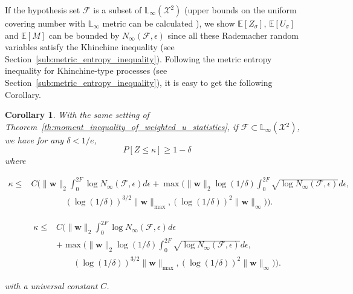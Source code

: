 \documentclass[letterpaper]{article} %
\def\DoubleColumn{}
\def\DoubleColumnEnd{}
\def\SingleColumn{}
\def\SingleColumnEnd{}
\newtheorem{corollary}{Corollary}
\newcommand{\E}{\mathbb{E}}
\newcommand{\Pro}{P}
\newcommand{\weight}{\mathbf{w}}
\newcommand{\xspace}{\mathcal{X}}
\newcommand{\rademacher}{\sigma}
\newcommand{\lebesgue}{\mathbb{L}}
\newcommand{\citep}[3]{(#1\ \citeauthor{#3}\ \citeyear{#3},\ #2)}
\begin{document}
If the hypothesis set $\mathcal{F}$ is a subset of $\lebesgue{}_\infty(\xspace^2)$ (upper bounds on the uniform covering number with $\lebesgue{}_\infty$ metric can be calculated \cite{cucker2007learning}), we show $\E[Z_\rademacher{}]$, $\E[U_\rademacher{}]$ and $\E[M]$ can be bounded by $N_\infty(\mathcal{F},\epsilon)$ since all these Rademacher random variables satisfy the Khinchine inequality (see Section~\ref{sub:metric_entropy_inequality}). Following the metric entropy inequality for Khinchine-type processes (see Section~\ref{sub:metric_entropy_inequality}), it is easy to get the following Corollary.

\begin{corollary}
    \label{cor:covering_number_inequality}
    With the same setting of Theorem~\ref{th:moment_inequality_of_weighted_u_statistics}, if $\mathcal{F}\subset \lebesgue{}_\infty(\xspace{}^2)$, we have for any $\delta<1/e$,
    \[\Pro[Z\le \kappa]\ge 1-\delta\]
    where 
    \SingleColumn
    \begin{align*}
        \kappa\le&C\Bigg(\|\weight{}\|_2\int_0^{2F}\log N_\infty(\mathcal F, \epsilon)d\epsilon+\max\Big(\|\weight{}\|_2\log(1/\delta)\int_0^{2F}\sqrt{\log N_\infty(\mathcal F,\epsilon)}d\epsilon,\\
        &\qquad\qquad(\log(1/\delta))^{3/2}\|\weight{}\|_{\max}, (\log(1/\delta))^2\|\weight{}\|_\infty\Big)\Bigg).
    \end{align*}
    \SingleColumnEnd
    \DoubleColumn
    \begin{align*}
        \kappa\le&C\Bigg(\|\weight{}\|_2\int_0^{2F}\log N_\infty(\mathcal F, \epsilon)d\epsilon\\
        &+\max\Big(\|\weight{}\|_2\log(1/\delta)\int_0^{2F}\sqrt{\log N_\infty(\mathcal F,\epsilon)}d\epsilon,\\
        &\qquad(\log(1/\delta))^{3/2}\|\weight{}\|_{\max}, (\log(1/\delta))^2\|\weight{}\|_\infty\Big)\Bigg).
    \end{align*}
    \DoubleColumnEnd
    with a universal constant $C$.
\end{corollary}




\end{document}

